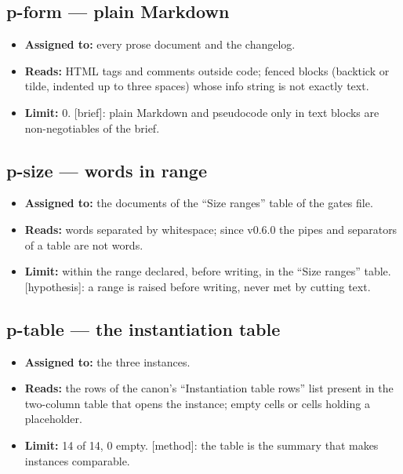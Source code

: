 \documentclass[
  american,
  10pt,
]{report}
\providecommand{\tightlist}{%
  \setlength{\itemsep}{0pt}\setlength{\parskip}{0pt}}
\renewcommand{\texttt}[1]{{\ttfamily\hyphenchar\font=-1 #1}}
\begin{document}
\subsection{\texorpdfstring{\texttt{p-\allowbreak{}form} --- plain
Markdown}{ --- plain Markdown}}\label{p-form-plain-markdown}

\begin{itemize}
\tightlist
\item
  \textbf{Assigned to:} every prose document and the changelog.
\item
  \textbf{Reads:} HTML tags and comments outside code; fenced blocks
  (backtick or tilde, indented up to three spaces) whose info string is
  not exactly \texttt{text}.
\item
  \textbf{Limit:} 0. \texttt{[brief]}: plain Markdown and pseudocode
  only in \texttt{text} blocks are non-negotiables of the brief.
\end{itemize}

\subsection{\texorpdfstring{\texttt{p-\allowbreak{}size} --- words in
range}{ --- words in range}}\label{p-size-words-in-range}

\begin{itemize}
\tightlist
\item
  \textbf{Assigned to:} the documents of the ``Size ranges'' table of
  the gates file.
\item
  \textbf{Reads:} words separated by whitespace; since v0.6.0 the pipes
  and separators of a table are not words.
\item
  \textbf{Limit:} within the range declared, before writing, in the
  ``Size ranges'' table. \texttt{[hypothesis]}: a range is raised before
  writing, never met by cutting text.
\end{itemize}

\subsection{\texorpdfstring{\texttt{p-\allowbreak{}table} --- the
instantiation
table}{ --- the instantiation table}}\label{p-table-the-instantiation-table}

\begin{itemize}
\tightlist
\item
  \textbf{Assigned to:} the three instances.
\item
  \textbf{Reads:} the rows of the canon's ``Instantiation table rows''
  list present in the two-column table that opens the instance; empty
  cells or cells holding a placeholder.
\item
  \textbf{Limit:} 14 of 14, 0 empty. \texttt{[method]}: the table is the
  summary that makes instances comparable.
\end{itemize}
\end{document}
